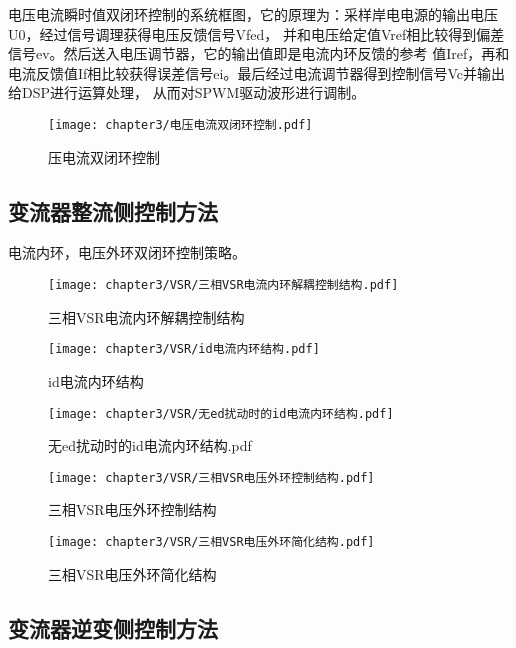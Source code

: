 电压电流瞬时值双闭环控制的系统框图，它的原理为：采样岸电电源的输出电压U0，经过信号调理获得电压反馈信号Vfed，
并和电压给定值Vref相比较得到偏差信号ev。然后送入电压调节器，它的输出值即是电流内环反馈的参考
值Iref，再和电流反馈值If相比较获得误差信号ei。最后经过电流调节器得到控制信号Vc并输出给DSP进行运算处理，
从而对SPWM驱动波形进行调制。

\begin{figure}[!htp]
	\centering
	\texttt{[image: chapter3/电压电流双闭环控制.pdf]}
	\caption{压电流双闭环控制}
	\label{fig:压电流双闭环控制}
\end{figure}

\subsection{变流器整流侧控制方法}

电流内环，电压外环双闭环控制策略。

\begin{figure}[!htp]
	\centering
	\texttt{[image: chapter3/VSR/三相VSR电流内环解耦控制结构.pdf]}
	\caption{三相VSR电流内环解耦控制结构}
	\label{fig:三相VSR电流内环解耦控制结构}
\end{figure}

\begin{figure}[!htp]
	\centering
	\texttt{[image: chapter3/VSR/id电流内环结构.pdf]}
	\caption{id电流内环结构}
	\label{fig:id电流内环结构}
\end{figure}

\begin{figure}[!htp]
	\centering
	\texttt{[image: chapter3/VSR/无ed扰动时的id电流内环结构.pdf]}
	\caption{无ed扰动时的id电流内环结构.pdf}
	\label{fig:无ed扰动时的id电流内环结构.pdf}
\end{figure}

\begin{figure}[!htp]
	\centering
	\texttt{[image: chapter3/VSR/三相VSR电压外环控制结构.pdf]}
	\caption{三相VSR电压外环控制结构}
	\label{fig:三相VSR电压外环控制结构}
\end{figure}

\begin{figure}[!htp]
	\centering
	\texttt{[image: chapter3/VSR/三相VSR电压外环简化结构.pdf]}
	\caption{三相VSR电压外环简化结构}
	\label{fig:三相VSR电压外环简化结构}
\end{figure}

\subsection{变流器逆变侧控制方法}


